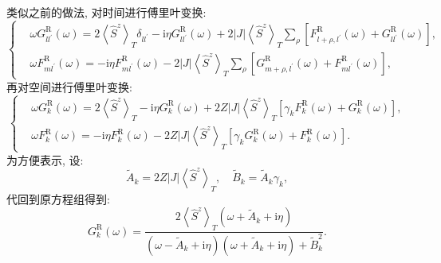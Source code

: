 类似之前的做法, 对时间进行傅里叶变换:
\begin{equation}
\left\{\begin{aligned}
&\omega G_{l l^{\prime}}^\mathrm{R}(\omega)=2\left\langle\hat{S}^{z}\right\rangle_{T} \delta_{l l^{\prime}}-\mathrm{i} \eta G_{l l^{\prime}}^\mathrm{R}(\omega)+2|J|\left\langle\hat{S}^{z}\right\rangle_{T} \sum_{\rho}\left[F_{l+\rho, l^{\prime}}^\mathrm{R}(\omega)+G_{l l^{\prime}}^\mathrm{R}(\omega)\right], \\
&\omega F_{m l^{\prime}}^\mathrm{R}(\omega)=-\mathrm{i} \eta F_{m l^{\prime}}^\mathrm{R}(\omega)-2|J|\left\langle\hat{S}^{z}\right\rangle_{T} \sum_{\rho}\left[G_{m+\rho, l^{\prime}}^\mathrm{R}(\omega)+F_{m l^{\prime}}^\mathrm{R}(\omega)\right],
\end{aligned}\right.
\end{equation}
再对空间进行傅里叶变换:
\begin{equation}
\left\{\begin{aligned}
&\omega G_{k}^\mathrm{R}(\omega)=2\left\langle\hat{S}^{z}\right\rangle_{T}-\mathrm{i} \eta G_{k}^\mathrm{R}(\omega)+2 Z|J|\left\langle\hat{S}^{z}\right\rangle_{T}\left[\gamma_{k} F_{k}^\mathrm{R}(\omega)+G_{k}^\mathrm{R}(\omega)\right] ,\\
&\omega F_{k}^\mathrm{R}(\omega)=-\mathrm{i} \eta F_{k}^\mathrm{R}(\omega)-2 Z|J|\left\langle\hat{S}^{z}\right\rangle_{T}\left[\gamma_{k} G_{k}^\mathrm{R}(\omega)+F_{k}^\mathrm{R}(\omega)\right].
\end{aligned}\right.
\end{equation}
为方便表示, 设:
\begin{equation}
\tilde{A}_{k}=2 Z|J|\left\langle\hat{S}^{z}\right\rangle_{T}, \quad \tilde{B}_{k}=\tilde{A}_{k} \gamma_{k},
\end{equation}
代回到原方程组得到:
\begin{equation}
 G_{k}^\mathrm{R}(\omega)=\frac{2\left\langle\hat{S}^{z}\right\rangle_{T}\left(\omega+\tilde{A}_{k}+\mathrm{i} \eta\right)}{\left(\omega-\tilde{A}_{k}+\mathrm{i} \eta\right)\left(\omega+\tilde{A}_{k}+\mathrm{i} \eta\right)+\tilde{B}_k^{2}} .
\end{equation}

